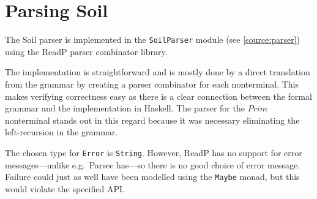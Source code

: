 
\section{Parsing Soil}

The Soil parser is implemented in the \verb|SoilParser| module (see
\autoref{source:parser}) using the ReadP parser combinator library.

The implementation is straightforward and is mostly done by a direct
translation from the grammar by creating a parser combinator for each
nonterminal. This makes verifying correctness easy as there is a clear
connection between the formal grammar and the implementation in Haskell. The
parser for the $Prim$ nonterminal stands out in this regard because it was
necessary eliminating the left-recursion in the grammar.

The chosen type for \verb|Error| is \verb|String|. However, ReadP has no
support for error messages---unlike e.g.\ Parsec has---so there is no good
choice of error message. Failure could just as well have been modelled using
the \verb|Maybe| monad, but this would violate the specified API.
